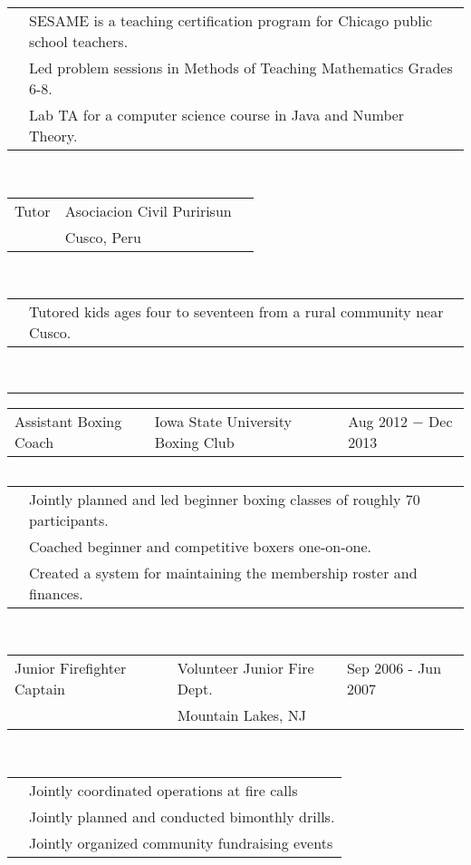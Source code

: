 \documentclass{article}
\newcommand{\q}{$\quad$ \newline}
\newcommand{\vl}{4.25}
\newcommand{\wl}{8.4}
\newcommand{\ww}{13}
\newcommand{\myrule}{\noindent \rule{\textwidth}{1pt}}
\begin{document}
\noindent \begin{tabular}{@{}p{\vl cm}p{\ww cm}@{}}
& SESAME is a teaching certification program for Chicago public school teachers. \\
& Led problem sessions in Methods of Teaching Mathematics Grades 6-8. \\
& Lab TA for a computer science course in Java and Number Theory.
\end{tabular} \q \q  

\noindent \begin{tabular}{@{}p{\vl cm}p{\wl cm}l@{}}
Tutor & Asociacion Civil Puririsun & \\
& Cusco, Peru
\end{tabular} \q \q

\noindent \begin{tabular}{@{}p{\vl cm}p{\ww cm}@{}}
& Tutored kids ages four to seventeen from a rural community near Cusco.
\end{tabular} \q \q


\myrule
 
\noindent \begin{tabular}{@{}p{\vl cm}p{\wl cm}l@{}}
Assistant Boxing Coach & Iowa State University Boxing Club & Aug 2012 $-$ Dec 2013
\end{tabular} \q 
 
\noindent \begin{tabular}{@{}p{\vl cm}p{\ww cm}@{}}
& Jointly planned and led beginner boxing classes of roughly 70 participants. \\
& Coached beginner and competitive boxers one-on-one. \\
& Created a system for maintaining the membership roster and finances. \\
\end{tabular} \q \q

\noindent \begin{tabular}{@{}p{\vl cm}p{\wl cm}l@{}}
Junior Firefighter Captain & Volunteer Junior Fire Dept. & Sep 2006 - Jun 2007 \\
& Mountain Lakes, NJ &
\end{tabular} \q \q

\noindent \begin{tabular}{@{}p{\vl cm}p{\ww cm}@{}}
& Jointly coordinated operations at fire calls \\
& Jointly planned and conducted bimonthly drills. \\
& Jointly organized community fundraising events
\end{tabular} \q \q 
\end{document}
